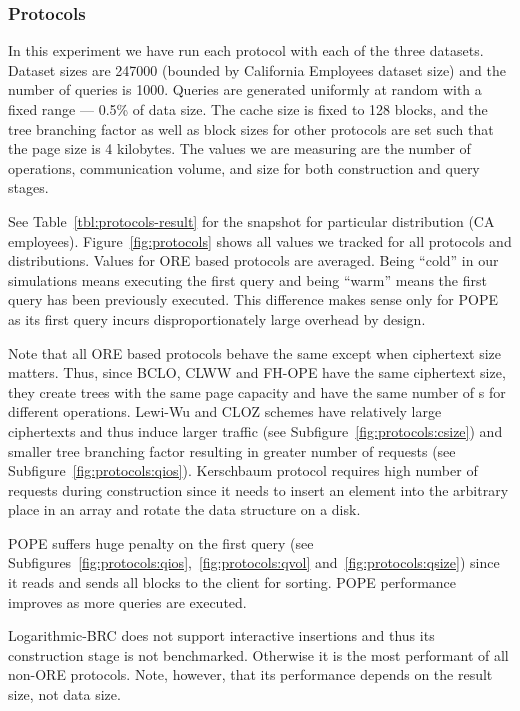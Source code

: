 		\subsubsection{Protocols}\label{sec:results-protocols}

			In this experiment we have run each protocol with each of the three datasets.
			Dataset sizes are 247000 (bounded by California Employees dataset size) and the number of queries is 1000.
			Queries are generated uniformly at random with a fixed range --- 0.5\% of data size.
			The cache size is fixed to 128 blocks, and the {\BPlus} tree branching factor as well as block sizes for other protocols are set such that the page size is 4 kilobytes.
			The values we are measuring are the number of {\IO} operations, communication volume, and size for both construction and query stages.

			See Table~\ref{tbl:protocols-result} for the snapshot for particular distribution (CA employees).
			Figure~\ref{fig:protocols} shows all values we tracked for all protocols and distributions.
			Values for ORE based protocols are averaged.
			Being ``cold'' in our simulations means executing the first query and being ``warm'' means the first query has been previously executed.
			This difference makes sense only for POPE as its first query incurs disproportionately large overhead by design.

			Note that all ORE based protocols behave the same except when ciphertext size matters.
			Thus, since BCLO, CLWW and FH-OPE have the same ciphertext size, they create {\BPlus} trees with the same page capacity and have the same number of {\IO}s for different operations.
			Lewi-Wu and CLOZ schemes have relatively large ciphertexts and thus induce larger traffic (see Subfigure~\ref{fig:protocols:csize}) and smaller {\BPlus} tree branching factor resulting in greater number of {\IO} requests (see Subfigure~\ref{fig:protocols:qios}).
			Kerschbaum protocol requires high number of {\IO} requests during construction since it needs to insert an element into the arbitrary place in an array and rotate the data structure on a disk.

			POPE suffers huge penalty on the first query (see Subfigures~\ref{fig:protocols:qios},~\ref{fig:protocols:qvol} and~\ref{fig:protocols:qsize}) since it reads and sends all blocks to the client for sorting.
			POPE performance improves as more queries are executed.

			Logarithmic\hyp{}BRC does not support interactive insertions and thus its construction stage is not benchmarked.
			Otherwise it is the most performant of all non-ORE protocols.
			Note, however, that its performance depends on the result size, not data size.

